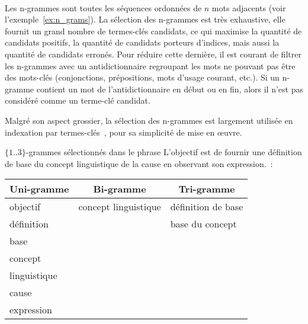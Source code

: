     ~\\Les n-grammes sont
    toutes les séquences ordonnées de $n$ mots adjacents (voir
    l'exemple~\ref{ex:n_grams}). La sélection des n-grammes est très exhaustive,
    elle fournit un grand nombre de termes-clés candidats, ce qui maximise la
    quantité de candidats positifs, la quantité de candidats porteurs d'indices,
    mais aussi la quantité de candidats erronés. Pour réduire cette dernière, il
    est courant de filtrer les n-grammes avec un
    antidictionnaire regroupant les mots ne pouvant pas être des
    mots-clés (conjonctions, prépositions, mots d'usage courant, etc.). Si un
    n-gramme contient un mot de l'antidictionnaire en début ou en fin, alors il
    n'est pas considéré comme un terme-clé candidat.
    
    Malgré son aspect grossier, la sélection des n-grammes est largement
    utilisée en indexation par
    termes-clés~\cite{witten1999kea,hulth2003keywordextraction,medelyan2009humancompetitivetagging},
    pour sa simplicité de mise en \oe{}uvre.

    \begin{example}\label{ex:n_grams}
      $\{1..3\}$-grammes sélectionnés dans le phrase \og{}L'objectif est de
      fournir une définition de base du concept linguistique de la cause en
      observant son expression.\fg{}~:
      \begin{center}
        \begin{tabular}{l|l|l}
          \toprule
          \multicolumn{1}{c|}{\textbf{Uni-gramme}} & \multicolumn{1}{c|}{\textbf{Bi-gramme}} & \multicolumn{1}{c}{\textbf{Tri-gramme}}\\
          \hline
          \og{}objectif\fg{} & \og{}concept linguistique\fg{} & \og{}définition de base\fg{}\\
          \og{}définition\fg{} & & \og{}base du concept\fg{}\\
          \og{}base\fg{} & &\\
          \og{}concept\fg{} & &\\
          \og{}linguistique\fg{} & &\\
          \og{}cause\fg{} & &\\
          \og{}expression\fg{} & &\\
          \bottomrule
        \end{tabular}
      \end{center}\vspace{.25em}
    \end{example}

